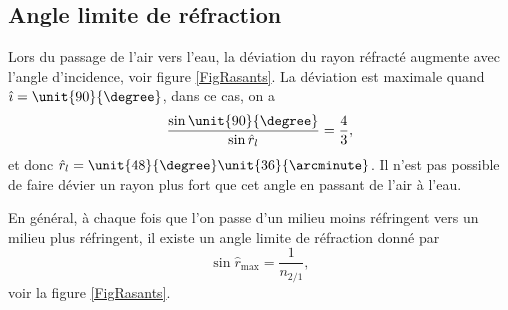 \documentclass[a4paper,12pt]{book}
\newcommand{\pstTransHom}[5]{%
\pstTranslation{#1}{#2}{#3}[inter]
\pstHomO[HomCoef=#4]{#3}{inter}[#5]
}
\newcommand{\pstDecompForce}[8]{%
  \psset{PointSymbol=none, PointName=none}
\pstTranslation{#3}{#4}{#1}[ibBu]
\pstTranslation{#5}{#6}{#1}[ibBd]

\pstTranslation{#3}{#4}{#2}[jbBu]
\pstTranslation{#5}{#6}{#2}[jbBd]

\pstInterLL{#2}{jbBd}{#1}{ibBu}{#7}
\pstInterLL{#2}{jbBu}{#1}{ibBd}{#8}
}
\newcommand{\pstDioptre}[8][Diinter]{%
  \psset{PointSymbol=none, PointName=none}
	\pstGeonode(#2){DiO}(#3){DiP}(#4){DiRi}
	\pstRotation[RotAngle=90]{DiO}{DiP}[DiQ]				%
   	\pstDecompForce{DiO}{DiRi}{DiO}{DiP}{DiO}{DiQ}{DiRix}{DiRiy}		%
  \FPeval{Dicoefrel}{#5/#6}
	\pstTransHom{DiRi}{DiRiy}{DiO}{\Dicoefrel}{DiRex}			%

   	\pstTranslation{DiO}{DiRex}{DiQ}[DiR]
   	\pstInterLC{DiRex}{DiR}{DiO}{DiRi}{#8}{#1}				%

	\pstTranslation{DiRi}{DiRiy}{DiRiy}[#7]					%
}
\theoremstyle{mes_exemples}	\newtheorem{exemple}[numtho]{Exemple}
\theoremstyle{mes_tho}
\begin{document}
\subsection{Angle limite de réfraction}

Lors du passage de l'air vers l'eau, la déviation du rayon réfracté augmente avec l'angle d'incidence, voir figure \ref{FigRasants}. La déviation est maximale quand $\hat\imath=\unit{90}{\degree}$, dans ce cas, on a 
\[ 
  \frac{ \sin\unit{90}{\degree} }{ \sin\hat r_{l} }=\frac{ 4 }{ 3 },
\]
et donc $\hat r_{l}=\unit{48}{\degree}\unit{36}{\arcminute}$. Il n'est pas possible de faire dévier un rayon plus fort que cet angle en passant de l'air à l'eau.

En général, à chaque fois que l'on passe d'un milieu moins réfringent vers un milieu plus réfringent, il existe un angle limite de réfraction donné par
\[ 
  \sin\hat r_{\text{max}}=\frac{1}{ n_{2/1} },
\]
voir la figure \ref{FigRasants}. 

\newcommand{\PreFigAngleAugmente}{%
\pstGeonode(0,0){O}(2,0){P}
\pstRotation[RotAngle=90]{O}{P}[Qi]
\pstHomO[HomCoef=0.5]{O}{Qi}[Q]
\pstRotation[RotAngle=180]{O}{P}[R]
\pstHomO[HomCoef=-1]{O}{Q}[S]

\def\interIndiceUn{0.99}
\def\interIndiceDeux{1}

\pstRotation[RotAngle=-18]{O}{R}[Ri]		%
    \pstDioptre{O}{P}{Ri}{\interIndiceUn}{\interIndiceDeux}{Ris}{Rie}	%

\pstRotation[RotAngle=-36]{O}{R}[Rj]		%
    \pstDioptre{O}{P}{Rj}{\interIndiceUn}{\interIndiceDeux}{Rjs}{Rje}	%

\pstRotation[RotAngle=-54]{O}{R}[Rk]		%
    \pstDioptre{O}{P}{Rk}{\interIndiceUn}{\interIndiceDeux}{Rks}{Rke}	%

\pstRotation[RotAngle=-72]{O}{R}[Rl]		%
    \pstDioptre{O}{P}{Rl}{\interIndiceUn}{\interIndiceDeux}{Rls}{Rle}	%

\pstRotation[RotAngle=-90]{O}{R}[Rm]		%
    \pstDioptre{O}{P}{Rm}{\interIndiceUn}{\interIndiceDeux}{Rms}{Rme}	%

\pstRotation[RotAngle=0]{O}{R}[Rn]		%
    \pstDioptre{O}{P}{Rn}{\interIndiceUn}{\interIndiceDeux}{Rns}{Rne}	%
}
\end{document}
